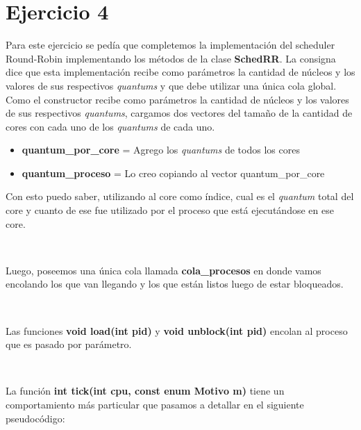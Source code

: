 \section{Ejercicio 4}

Para este ejercicio se pedía que completemos la implementación del scheduler Round-Robin implementando los métodos de la clase \textbf{SchedRR}. La consigna dice que esta implementación recibe como parámetros la cantidad de núcleos y los valores de sus respectivos \textit{quantums} y que debe utilizar una única cola global.
~
Como el constructor recibe como parámetros la cantidad de núcleos y los valores de sus respectivos \textit{quantums}, cargamos dos vectores del tamaño de la cantidad de cores con cada uno de los \textit{quantums} de cada uno.

\begin{itemize}
	\item \textbf{quantum\_por\_core} = Agrego los \textit{quantums} de todos los cores
	\item \textbf{quantum\_proceso} = Lo creo copiando al vector quantum\_por\_core
\end{itemize}

Con esto puedo saber, utilizando al core como índice, cual es el \textit{quantum} total del core y cuanto de ese fue utilizado por el proceso que está ejecutándose en ese core.

~

Luego, poseemos una única cola llamada \textbf{cola\_procesos} en donde vamos encolando los que van llegando y los que están listos luego de estar bloqueados.

~

Las funciones \textbf{void load(int pid)} y \textbf{void unblock(int pid)} encolan al proceso que es pasado por parámetro.

~

La función \textbf{int tick(int cpu, const enum Motivo m)} tiene un comportamiento más particular que pasamos a detallar en el siguiente pseudocódigo:

~

